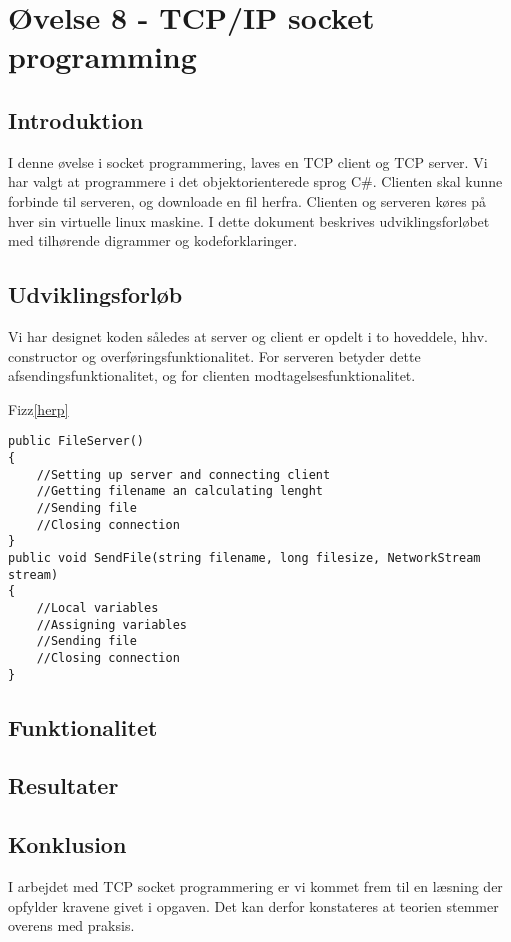 \section{Øvelse 8 - TCP/IP socket programming}

\subsection{Introduktion}
I denne øvelse i socket programmering, laves en TCP client og TCP server. Vi har valgt at programmere i det objektorienterede sprog C\#. Clienten skal kunne forbinde til serveren, og downloade en fil herfra. Clienten og serveren køres på hver sin virtuelle linux maskine. I dette dokument beskrives udviklingsforløbet med tilhørende digrammer og kodeforklaringer.
\subsection{Udviklingsforløb}
Vi har designet koden således at server og client er opdelt i to hoveddele, hhv. constructor og overføringsfunktionalitet. For serveren betyder dette afsendingsfunktionalitet, og for clienten modtagelsesfunktionalitet.

Fizz\ref{herp}

\begin{lstlisting}[caption = Hoveddesign for server,label=herp]
public FileServer()
{
	//Setting up server and connecting client
	//Getting filename an calculating lenght
	//Sending file 
	//Closing connection
}
public void SendFile(string filename, long filesize, NetworkStream stream)
{
	//Local variables
	//Assigning variables
	//Sending file
	//Closing connection
}
\end{lstlisting}

\subsection{Funktionalitet}

\subsection{Resultater}

\subsection{Konklusion}
I arbejdet med TCP socket programmering er vi kommet frem til en læsning der opfylder kravene givet i opgaven. Det kan derfor konstateres at teorien stemmer overens med praksis.